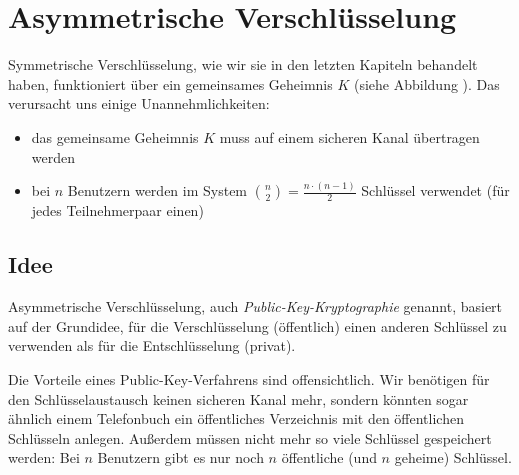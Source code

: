 \chapter{Asymmetrische Verschlüsselung}
\label{ch:asymmenc}

Symmetrische Verschlüsselung, wie wir sie in den letzten Kapiteln behandelt haben, funktioniert über ein gemeinsames Geheimnis $K$ (siehe Abbildung
).
Das verursacht uns einige Unannehmlichkeiten:

\begin{itemize}
  \item das gemeinsame Geheimnis $K$ muss auf einem sicheren Kanal übertragen werden
  \item bei $n$ Benutzern werden im System $\binom{n}{2} = \frac{n \cdot (n-1)}{2}$ Schlüssel verwendet (für jedes Teilnehmerpaar einen)
\end{itemize}

%






\section{Idee}
Asymmetrische Verschlüsselung, auch \emph{Public-Key-Kryptographie}
genannt,  basiert auf der Grundidee, für die Verschlüsselung
(öffentlich) einen anderen Schlüssel zu verwenden als für die
Entschlüsselung (privat).

Die Vorteile eines Public-Key-Verfahrens sind offensichtlich. Wir
benötigen für den Schlüsselaustausch keinen sicheren Kanal mehr, sondern
könnten sogar ähnlich einem Telefonbuch ein öffentliches Verzeichnis mit
den öffentlichen Schlüsseln anlegen. Außerdem müssen nicht mehr so viele
Schlüssel gespeichert werden: Bei $n$ Benutzern gibt es nur noch $n$
öffentliche (und $n$ geheime) Schlüssel. 

